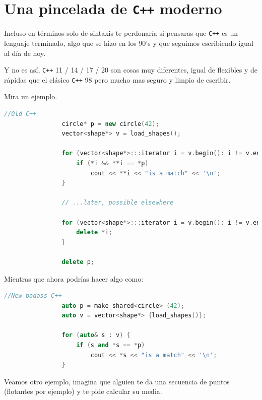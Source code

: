 \documentclass[12pt, fleqn]{report}                             %
\theoremstyle{break}                                            %
\newcommand{\textCode}[1]  { \texttt{#1} }                      %
\newcommand{\Cpp}{\ignorespaces\textCode{C++}}                  %
\begin{document}
        \clearpage
        \section{ Una pincelada de \Cpp moderno}

            Incluso en términos solo de sintaxis te perdonaría si pensaras que \Cpp es un
            lenguaje terminado, algo que se hizo en los 90's y que seguimos escribiendo
            igual al día de hoy.

            Y no es así, \Cpp 11 / 14 / 17 / 20 son cosas muy diferentes, igual de flexibles
            y de rápidas que el clásico \Cpp 98 pero mucho mas seguro y limpio de escribir.

            Mira un ejemplo.

            \begin{lstlisting}[language=C++, gobble=16]
                //Old C++
                circle* p = new circle(42);
                vector<shape*> v = load_shapes();

                for (vector<shape*>:::iterator i = v.begin(): i != v.end(); ++i) {
                    if (*i && **i == *p)
                        cout << **i << "is a match" << '\n';
                }

                // ...later, possible elsewhere

                for (vector<shape*>:::iterator i = v.begin(): i != v.end(); ++i) {
                    delete *i;
                }

                delete p;
            \end{lstlisting}

            Mientras que ahora podrías hacer algo como:
            \begin{lstlisting}[language=C++, gobble=16]
                //New badass C++
                auto p = make_shared<circle> (42);
                auto v = vector<shape*> {load_shapes()};

                for (auto& s : v) {
                    if (s and *s == *p)
                        cout << *s << "is a match" << '\n';
                }
            \end{lstlisting}

            \clearpage

            Veamos otro ejemplo, imagina que alguien te da una secuencia de 
            puntos (flotantes por ejemplo) y te pide calcular su media.
\end{document}
